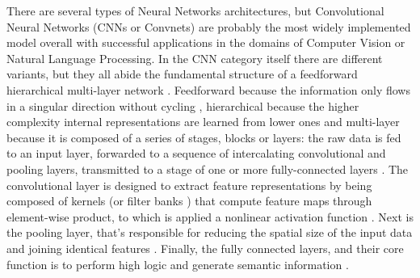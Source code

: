 \documentclass[class=report, crop=false, a4paper, 12pt]{standalone}
\begin{document}
There are several types of Neural Networks architectures, but Convolutional Neural Networks (CNNs or Convnets) are probably the most widely implemented model overall \autocite{yamashitaConvolutionalNeuralNetworks2018, liSurveyConvolutionalNeural2022} with successful applications in the domains of Computer Vision \autocite{krizhevskyImageNetClassificationDeep2012,taigmanDeepFaceClosingGap2014,tompsonEfficientObjectLocalization2015, zhangImprovedBreastCancer2021} or Natural Language Processing\autocite{abdel-hamidConvolutionalNeuralNetworks2014, wangGenCNNConvolutionalArchitecture2015, xiangConvolutionalNeuralNetworkbased2020}. In the CNN category itself there are different variants, but they all abide the fundamental structure of a feedforward hierarchical multi-layer network . Feedforward because the information only flows in a singular direction without cycling \autocite{zellSimulationNeuronalerNetze1994}, hierarchical because the higher complexity internal representations are learned from lower ones \autocite{lecunDeepLearning2015, zhuBCNNBranchConvolutional2017} and multi-layer because it is composed of a series of stages, blocks or layers: the raw data is fed to an input layer, forwarded to a sequence of intercalating convolutional and pooling layers, transmitted to a stage of one or more fully-connected layers \autocite{lecunDeepLearning2015, yamashitaConvolutionalNeuralNetworks2018, guRecentAdvancesConvolutional2018, alzubaidiReviewDeepLearning2021}. The convolutional layer is designed to extract feature representations by being composed of kernels (or filter banks \autocite{lecunDeepLearning2015}) that compute feature maps through element-wise product, to which is applied a nonlinear activation function \autocite{guRecentAdvancesConvolutional2018,yamashitaConvolutionalNeuralNetworks2018}. Next is the pooling layer, that's responsible for reducing the spatial size of the input data \autocite{guRecentAdvancesConvolutional2018} and joining identical features \autocite{lecunDeepLearning2015}. Finally, the fully connected layers, and their core function is to perform high logic and generate semantic information \autocite{guRecentAdvancesConvolutional2018}.
\end{document}
